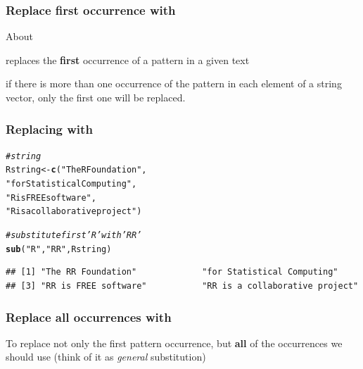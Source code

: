 \documentclass[12pt]{beamer}\usepackage[]{graphicx}\usepackage[]{color}
\makeatletter
\newcommand{\hlstr}[1]{\textcolor[rgb]{0.192,0.494,0.8}{#1}}%
\newcommand{\hlcom}[1]{\textcolor[rgb]{0.678,0.584,0.686}{\textit{#1}}}%
\newcommand{\hlstd}[1]{\textcolor[rgb]{0.345,0.345,0.345}{#1}}%
\newcommand{\hlkwb}[1]{\textcolor[rgb]{0.69,0.353,0.396}{#1}}%
\newcommand{\hlkwd}[1]{\textcolor[rgb]{0.737,0.353,0.396}{\textbf{#1}}}%
\newenvironment{kframe}{%
 \def\at@end@of@kframe{}%
 \ifinner\ifhmode%
  \def\at@end@of@kframe{\end{minipage}}%
  \begin{minipage}{\columnwidth}%
 \fi\fi%
 \def\FrameCommand##1{\hskip\@totalleftmargin \hskip-\fboxsep
 \colorbox{shadecolor}{##1}\hskip-\fboxsep
     \hskip-\linewidth \hskip-\@totalleftmargin \hskip\columnwidth}%
 \MakeFramed {\advance\hsize-\width
   \@totalleftmargin\z@ \linewidth\hsize
   \@setminipage}}%
 {\par\unskip\endMakeFramed%
 \at@end@of@kframe}
\newenvironment{knitrout}{}{} %
\makeatother
\begin{document}

\begin{frame}
\frametitle{Replace first occurrence with }

About {\hilit {}}
\bbi
  \item {} replaces the \textbf{first} occurrence of a pattern in a given text
  \item if there is more than one occurrence of the pattern in each element of a string vector, only the first one will be replaced.
\ei

\end{frame}


\begin{frame}[fragile]
\frametitle{Replacing with }

\begin{knitrout}\scriptsize
{}\color{fgcolor}\begin{kframe}
\begin{alltt}
\hlcom{# string}
\hlstd{Rstring} \hlkwb{<-} \hlkwd{c}\hlstd{(}\hlstr{"The R Foundation"}\hlstd{,}
            \hlstr{"for Statistical Computing"}\hlstd{,}
            \hlstr{"R is FREE software"}\hlstd{,}
            \hlstr{"R is a collaborative project"}\hlstd{)}

\hlcom{# substitute first 'R' with 'RR'}
\hlkwd{sub}\hlstd{(}\hlstr{"R"}\hlstd{,} \hlstr{"RR"}\hlstd{, Rstring)}
\end{alltt}
\begin{verbatim}
## [1] "The RR Foundation"             "for Statistical Computing"    
## [3] "RR is FREE software"           "RR is a collaborative project"
\end{verbatim}
\end{kframe}
\end{knitrout}

\end{frame}


\begin{frame}
\frametitle{Replace all occurrences with }

To replace not only the first pattern occurrence, but \textbf{all} of the occurrences we should use {\hilit {}} (think of it as \textit{general} substitution)

\end{frame}
\end{document}
